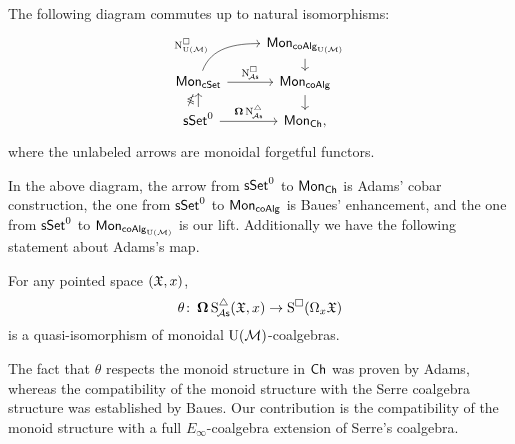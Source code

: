 
\begin{theorem*}
	The following diagram commutes up to natural isomorphisms:
	\[
	\begin{tikzcd} [row sep=small]
		& \Mon_{\coAlg_\UM} \arrow[d] \\
		\Mon_{\cSet} \arrow[ru, "\cchainsUM", out=70, in=180, near start] \arrow[r, "\cchainsA"]
		& \Mon_{\coAlg} \arrow[d] \\
		\sSet^0 \arrow[r, "\cobar \schainsA"] \arrow[u, "\ccobar"]
		& \Mon_{\Ch},
	\end{tikzcd}
	\]
	where the unlabeled arrows are monoidal forgetful functors.
\end{theorem*}

In the above diagram, the arrow from $\mathsf{sSet}^0$ to $\mathsf{Mon}_{\mathsf{Ch}}$ is Adams' cobar construction, the one from $\mathsf{sSet}^0$ to $\mathsf{Mon}_{\mathsf{coAlg}}$ is Baues' enhancement, and the one from $\mathsf{sSet}^0$ to $\mathsf{Mon}_{\mathsf{coAlg}_{{\operatorname{U}(\mathcal{M})}}}$ is our lift.
Additionally we have the following statement about Adams's map.

\begin{theorem*}
	For any pointed space $(\mathfrak{X}, x)$,
	\[
	\theta \colon \operatorname{\mathbf{\Omega}} \operatorname{S^{\triangle}_{\!{\mathcal{A}\mathsf{s}}}}(\mathfrak{X}, x) \to \operatorname{S^{\square}}(\Omega_x \mathfrak{X})
	\]
	is a quasi-isomorphism of monoidal ${\operatorname{U}(\mathcal{M})}$-coalgebras.
\end{theorem*}

The fact that $\theta$ respects the monoid structure in $\mathsf{Ch}$ was proven by Adams, whereas the compatibility of the monoid structure with the Serre coalgebra structure was established by Baues.
Our contribution is the compatibility of the monoid structure with a full $E_\infty$-coalgebra extension of Serre's coalgebra.